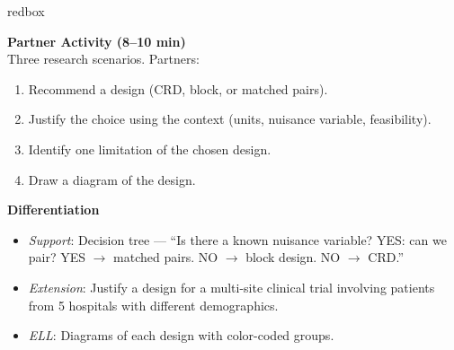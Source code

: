 \documentclass[10pt]{article}
\begin{document}
\begin{skillbox}{redbox}
\begin{minipage}[t]{0.48\linewidth}
    \textbf{Partner Activity (8--10 min)}\\
    Three research scenarios. Partners:
    \begin{enumerate}
        \item Recommend a design (CRD, block, or matched pairs).
        \item Justify the choice using the context (units, nuisance variable,
              feasibility).
        \item Identify one limitation of the chosen design.
        \item Draw a diagram of the design.
    \end{enumerate}
\end{minipage}
\hfill
\begin{minipage}[t]{0.48\linewidth}
    \textbf{Differentiation}
    \begin{itemize}
        \item \textit{Support}: Decision tree --- ``Is there a known nuisance variable?
              YES: can we pair? YES $\to$ matched pairs. NO $\to$ block design.
              NO $\to$ CRD.''
        \item \textit{Extension}: Justify a design for a multi-site clinical trial
              involving patients from 5 hospitals with different demographics.
        \item \textit{ELL}: Diagrams of each design with color-coded groups.
    \end{itemize}
\end{minipage}
\end{skillbox}
\end{document}
